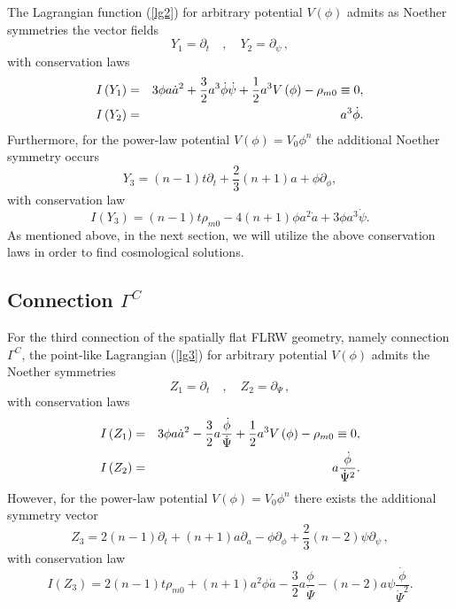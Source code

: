 \documentclass[onecolumn,superscriptaddress,secnumarabic,nobibnotes,aps,prd,nofootinbib,altaffilletter,11pt]{revtex4}
\begin{document}
The Lagrangian function (\ref{lg2}) for arbitrary potential $V\left( \phi
\right) $ admits as Noether symmetries the vector fields%
\begin{equation*}
Y_{1} = \partial _{t}\quad , \quad Y_{2} = \partial _{\psi }\,,
\end{equation*}%
with conservation laws%
\begin{eqnarray*}
I\left( Y_{1}\right) &=&3\phi a\dot{a}^{2}+\frac{3}{2}a^{3}\dot{\phi}\dot{%
\psi}+\frac{1}{2}a^{3}V\left( \phi \right) -\rho _{m0}\equiv 0, \\
I\left( Y_{2}\right) &=&a^{3}\dot{\phi}.
\end{eqnarray*}
Furthermore, for the power-law potential $V\left( \phi \right) =V_{0}\phi
^{n}$ the additional Noether symmetry occurs%
\begin{equation*}
Y_{3}=\left( n-1\right) t\partial _{t}+\frac{2}{3}\left( n+1\right) a+\phi
\partial _{\phi },
\end{equation*}
with conservation law%
\begin{equation*}
I\left( Y_{3}\right) =\left( n-1\right) t\rho _{m0}-4\left( n+1\right) \phi
a^{2}\dot{a}+3\phi a^{3}\dot{\psi}.
\end{equation*}%
\bigskip
As mentioned above, in the next section, we will utilize the above conservation laws in order to find cosmological solutions.

\subsection{Connection $\Gamma ^{C}$}

For the third connection of the spatially flat FLRW geometry, namely
connection $\Gamma ^{C}$, the point-like Lagrangian (\ref{lg3}) for
arbitrary potential $V\left( \phi \right) $ admits the Noether symmetries%
\begin{equation*}
    Z_{1} = \partial _{t}\quad , \quad Z_{2}  = \partial _{\Psi }\,,
\end{equation*}
with conservation laws%
\begin{eqnarray}
I\left( Z_{1}\right) &=&3\phi a\dot{a}^{2}-\frac{3}{2}a\frac{\dot{\phi}}{%
\dot{\Psi}}+\frac{1}{2}a^{3}V\left( \phi \right) -\rho _{m0}\equiv 0, \\
I\left( Z_{2}\right) &=&a\frac{\dot{\phi}}{\dot{\Psi}^{2}}.
\end{eqnarray}
However, for the power-law potential $V\left( \phi \right) =V_{0}\phi ^{n}$
there exists the additional symmetry vector%
\begin{equation}
Z_{3}=2(n-1)\partial _{t}+\left( n+1\right) a\partial _{a}-\phi \partial
_{\phi }+\frac{2}{3}\left( n-2\right) \psi \partial _{\psi }\,,
\end{equation}%
with conservation law%
\begin{equation}
I\left( Z_{3}\right) =2(n-1)t\rho _{m0}+\left( n+1\right) a^{2}\phi \dot{a}-%
\frac{3}{2}a\frac{\phi }{\dot{\Psi}}-\left( n-2\right) a\psi \frac{\dot{\phi}%
}{\dot{\Psi}^{2}}.
\end{equation}
\end{document}
